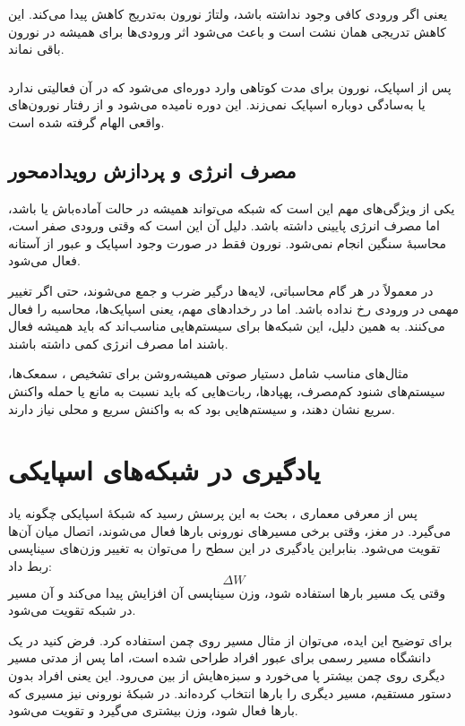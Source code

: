 \subsubsection{}
 یعنی اگر ورودی کافی وجود نداشته باشد، ولتاژ نورون به‌تدریج کاهش پیدا می‌کند. این کاهش تدریجی همان نشت است و باعث می‌شود اثر ورودی‌ها برای همیشه در نورون باقی نماند.

\subsubsection{}
پس از اسپایک، نورون برای مدت کوتاهی وارد دوره‌ای می‌شود که در آن فعالیتی ندارد یا به‌سادگی دوباره اسپایک نمی‌زند. این دوره  نامیده می‌شود و از رفتار نورون‌های واقعی الهام گرفته شده است.

\subsection{مصرف انرژی و پردازش رویدادمحور}
یکی از ویژگی‌های مهم  این است که شبکه می‌تواند همیشه در حالت آماده‌باش یا  باشد، اما مصرف انرژی پایینی داشته باشد. دلیل آن این است که وقتی ورودی صفر است، محاسبهٔ سنگین انجام نمی‌شود. نورون فقط در صورت وجود اسپایک و عبور از آستانه فعال می‌شود.

در  معمولاً در هر گام محاسباتی، لایه‌ها درگیر ضرب و جمع می‌شوند، حتی اگر تغییر مهمی در ورودی رخ نداده باشد. اما در  رخدادهای مهم، یعنی اسپایک‌ها، محاسبه را فعال می‌کنند. به همین دلیل، این شبکه‌ها برای سیستم‌هایی مناسب‌اند که باید همیشه فعال باشند اما مصرف انرژی کمی داشته باشند.

مثال‌های مناسب شامل دستیار صوتی همیشه‌روشن برای تشخیص ، سمعک‌ها، سیستم‌های شنود کم‌مصرف، پهپادها، ربات‌هایی که باید نسبت به مانع یا حمله واکنش سریع نشان دهند، و سیستم‌هایی بود که به واکنش سریع و محلی نیاز دارند.

\section{یادگیری در شبکه‌های اسپایکی}
پس از معرفی معماری ، بحث به این پرسش رسید که شبکهٔ اسپایکی چگونه یاد می‌گیرد. در مغز، وقتی برخی مسیرهای نورونی بارها فعال می‌شوند، اتصال میان آن‌ها تقویت می‌شود. بنابراین یادگیری در این سطح را می‌توان به تغییر وزن‌های سیناپسی ربط داد:
\[
\Delta W
\]
وقتی یک مسیر بارها استفاده شود، وزن سیناپسی آن افزایش پیدا می‌کند و آن مسیر در شبکه تقویت می‌شود.

برای توضیح این ایده، می‌توان از مثال مسیر روی چمن استفاده کرد. فرض کنید در یک دانشگاه مسیر رسمی برای عبور افراد طراحی شده است، اما پس از مدتی مسیر دیگری روی چمن بیشتر پا می‌خورد و سبزه‌هایش از بین می‌رود. این یعنی افراد بدون دستور مستقیم، مسیر دیگری را بارها انتخاب کرده‌اند. در شبکهٔ نورونی نیز مسیری که بارها فعال شود، وزن بیشتری می‌گیرد و تقویت می‌شود.

